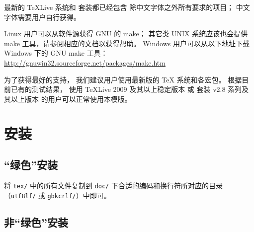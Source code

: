 	最新的 \TeX{}Live 系统和 \CTeX{} 套装都已经包含%
	除中文字体之外所有要求的项目；
	中文字体需要用户自行获得。

	Linux 用户可以从软件源获得 GNU 的 make；
	其它类 UNIX 系统应该也会提供 make 工具，请参阅相应的文档以获得帮助。%
	Windows 用户可以从以下地址下载 Windows 下的 GNU make 工具：\\
	\hspace*{\parindent}%
	\url{http://gnuwin32.sourceforge.net/packages/make.htm}

	为了获得最好的支持，
	我们建议用户使用最新版的 \TeX{} 系统和各宏包。
	根据目前已有的测试结果，
	使用 \TeX{}Live 2009 及其以上稳定版本%
	或 \CTeX{} 套装 v2.8 系列及其以上版本
	的用户可以正常使用本模版。
	
	\section{安装}\label{sec:inst}
	\subsection{“绿色”安装}

	将 \verb|tex/| 中的所有文件复制到 %
	\verb|doc/| 下合适的编码和换行符所对应的目录%
	（\verb|utf8lf/| 或 \verb|gbkcrlf/|）中即可。

	\subsection{非“绿色”安装}

